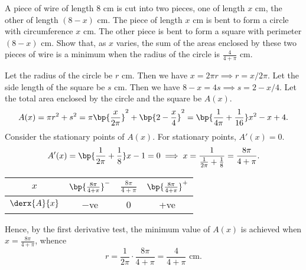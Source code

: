 \begin{problem}
    A piece of wire of length 8 cm is cut into two pieces, one of length $x$ cm, the other of length $(8-x)$ cm. The piece of length $x$ cm is bent to form a circle with circumference $x$ cm. The other piece is bent to form a square with perimeter $(8-x)$ cm. Show that, as $x$ varies, the sum of the areas enclosed by these two pieces of wire is a minimum when the radius of the circle is $\frac4{4+\pi}$ cm.
\end{problem}
\begin{solution}
    Let the radius of the circle be $r$ cm. Then we have $x = 2\pi r \implies r = x/2\pi$. Let the side length of the square be $s$ cm. Then we have $8-x=4s \implies s = 2-x/4$. Let the total area enclosed by the circle and the square be $A(x)$. \[A(x) = \pi r^2 + s^2 = \pi \bp{\frac{x}{2\pi}}^2 + \bp{2-\frac{x}4}^2 = \bp{\frac1{4\pi} + \frac1{16}}x^2 - x + 4.\] Consider the stationary points of $A(x)$. For stationary points, $A'(x) = 0$. \[A'(x) = \bp{\frac1{2\pi} + \frac1{8}}x - 1 = 0 \implies x = \frac1{\frac1{2\pi} + \frac1{8}} = \frac{8\pi}{4 + \pi}.\]

    \begin{table}[H]
        \centering
        \begin{tabular}{|c|c|c|c|}
        \hline
        $x$ & $\bp{\frac{8\pi}{4 + \pi}}^-$ & $\frac{8\pi}{4 + \pi}$ & $\bp{\frac{8\pi}{4 + \pi}}^+$ \\\hline
        $\derx{A}{x}$ & $-$ve   & 0 & +ve   \\\hline
        \end{tabular}
    \end{table}

    Hence, by the first derivative test, the minimum value of $A(x)$ is achieved when $x = \frac{8\pi}{4 + \pi}$, whence \[r = \frac{1}{2\pi} \cdot \frac{8\pi}{4 + \pi} = \frac{4}{4+\pi} \text{ cm}.\]
\end{solution}

